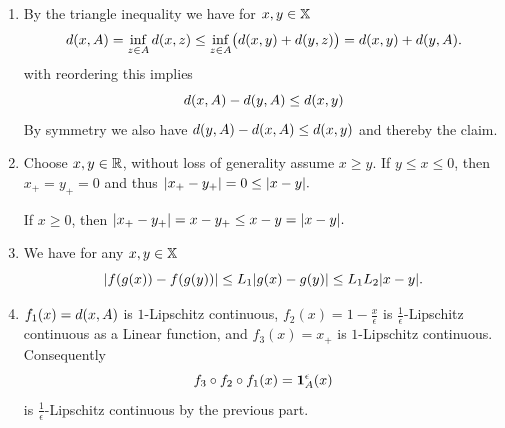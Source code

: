 \begin{solution}
\begin{enumerate}[wide=0pt]
    \item[\ref{it: (lip cont bump) set distance}]
    By the triangle inequality we have for \(x,y\in \mathbb{X}\)
    \[
        d(x,A)
        =\inf_{z\in A} d(x,z)
        \le \inf_{z\in A} \bigl(d(x,y) + d(y,z)\bigr)
        = d(x,y) + d(y,A).
    \]
    with reordering this implies
    \[
        d(x,A) - d(y,A) \le d(x,y)
    \]
    By symmetry we also have  \(d(y,A) - d(x,A) \le d(x,y)\)
    and thereby the claim.

    \item[\ref{it: (lip cont bump) hinge is lip}]
    Choose \(x,y\in \mathbb{R}\), without loss of generality
    assume \(x \ge y\). If \(y\le x\le 0\), then \(x_+ = y_+ = 0\) and thus
    \(
        \lvert x_+ - y_+\rvert = 0 \le \lvert x-y\rvert. 
    \)

    If \(x\ge 0\), then
    \(
        \lvert x_+ - y_+\rvert = x - y_+ \le x-y = \lvert x-y\rvert.
    \)

    \item[\ref{it: (lip cont bump) composition}]
    We have for any \(x,y\in \mathbb{X}\)
    \[
        \lvert f(g(x)) - f(g(y))\rvert
        \le L_1 \lvert g(x) - g(y)\rvert
        \le L_1L_2 \lvert x-y\rvert.
    \]

    \item[\ref{it: (lip cont bump) bump is lip}]
    \(f_1(x) = d(x,A)\) is \(1\)-Lipschitz continuous,
    \(f_2(x) = 1 - \frac{x}{\epsilon}\) is \(\frac1\epsilon\)-Lipschitz continuous
    as a Linear function, and \(f_3(x) = x_+\) is \(1\)-Lipschitz continuous. Consequently
    \[
        f_3 \circ f_2 \circ f_1(x) = \ind{A}^\epsilon(x)
    \]
    is \(\frac1\epsilon\)-Lipschitz continuous by the previous part.
\end{enumerate}
\end{solution}
